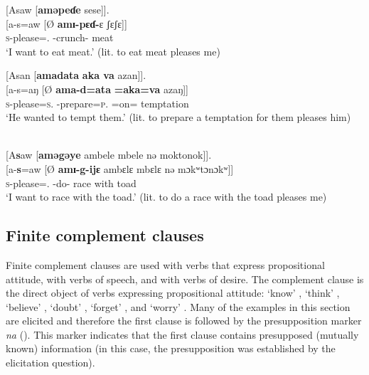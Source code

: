 \ea \label{ex:12:11}
{}[Asaw  [\textbf{aməpeɗe}  sese]].\\
\gll  {}[a-s=aw [Ø  \textbf{amɪ-pɛɗ{}-}ɛ ʃɛʃɛ]]\\
      \textsc{s}-please={\oneS}.{\IO} {} {\DEP}-crunch-{\CL}  meat\\
\glt  ‘I want to eat meat.’ (lit. to eat meat pleases me) 
\z 

\ea \label{ex:12:12}
{}[Asan  [\textbf{amadata}  \textbf{aka  va}  azan]].\\
\gll  {}[a-s=aŋ     [Ø   \textbf{ama-d=ata}  \textbf{=aka}\textbf{=va} azaŋ]]\\
      \textsc{s}-please=\textsc{s}.{\IO}  {}  {\DEP}-prepare=\textsc{p}.{\IO}  =on={\PRF}  temptation\\
\glt  ‘He wanted to tempt them.’ (lit. to prepare a temptation for them pleases him)
\z 

\ea \label{ex:12:13}
\\
{}[A\textbf{s}aw  [\textbf{aməgəye}  ambele  mbele  nə  moktonok]].\\
\gll  {}[a-\textbf{s}=aw  [Ø \textbf{amɪ-g-ijɛ}    {ambɛlɛ mbɛlɛ}  nə  mɔkʷtɔnɔkʷ]]\\
      \textsc{s}-please={\oneS}.{\IO}  {}  {\DEP}-do-{\CL}  race    with  toad\\
\glt  ‘I want to race with the toad.’ (lit. to do a race with the toad pleases me)
\z 

\subsection{Finite complement clauses}\label{sec:12.1.2}
\hypertarget{RefHeading1213381525720847}{}
Finite complement clauses are used with verbs that express propositional attitude, with verbs of speech, and with verbs of desire. The complement clause is the direct object of verbs expressing propositional attitude: ‘know’ , ‘think’ , ‘believe’ , ‘doubt’ , ‘forget’ , and ‘worry’ . Many of the examples in this section are elicited and therefore the first clause is followed by the presupposition marker \textit{na} (). This marker indicates that the first clause contains presupposed (mutually known) information (in this case, the presupposition was established by the elicitation question).



